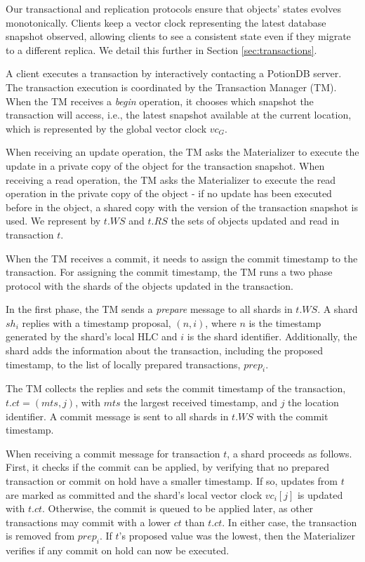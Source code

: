 \documentclass[sigplan,twocolumn,review,anonymous]{acmart}
\newcommand{\andre}[1]{\nbnote{Andre}{blue}{#1}}
\begin{document}
Our transactional and replication protocols ensure that objects' states evolves monotonically.
Clients keep a vector clock representing the latest database snapshot observed, allowing clients to see a consistent state even if they migrate to a different replica.
We detail this further in Section \ref{sec:transactions}. %


A client executes a transaction by interactively contacting a PotionDB server.
The transaction execution is coordinated by the Transaction Manager (TM).
%
When the TM receives a \emph{begin} operation, it chooses which snapshot the
transaction will access, i.e., the latest snapshot available at the current location,
which is represented by the global vector clock $\mathit{vc}_G$.

When receiving an update operation, the TM asks the Materializer to execute the update in
a private copy of the object for the transaction snapshot. When receiving a read operation, 
the TM asks the Materializer to execute the read operation in the private copy 
of the object - if no update has been executed before in the object, a shared copy with the version 
of the transaction snapshot is used. We represent by $t.WS$ and $t.RS$ the sets of objects updated 
and read in transaction $t$.

When the TM receives a commit, it needs to assign the commit timestamp to the transaction. 
For assigning the commit timestamp, the TM runs a two phase protocol with the shards of the objects
updated in the transaction. 
\andre{shouldn't it be named "two phase commit protocol"?}

In the first phase,  the TM sends a \emph{prepare} message to all shards in $t.WS$.
A shard $\mathit{sh}_i$ replies with a timestamp proposal, $(n,i)$, where $n$ is the timestamp
generated by the shard's local HLC and $i$ is the shard identifier. Additionally, the shard adds the information
about the transaction, including the proposed timestamp, to the list of locally prepared transactions, $prep_i$.

The TM collects the replies and sets the commit timestamp of the transaction,  $t\!.\mathit{ct} = (\mathit{mts}, j)$,
with $\mathit{mts}$ the largest received timestamp, and $j$ the 
location identifier.
A commit message is sent to all shards in $t.WS$ with the commit timestamp.

When receiving a commit message for transaction $t$, a shard proceeds as follows.
First, it checks if the commit can be applied, by verifying that no prepared transaction or commit on hold have a 
smaller timestamp.
If so, updates from $t$ are marked as committed and the shard's local vector clock $\mathit{vc}_i[j]$ is 
updated with $t\!.\mathit{ct}$. 
Otherwise, the commit is queued to be applied later, as other transactions may commit with a lower
$\mathit{ct}$ than $t\!.\mathit{ct}$.
In either case,  the transaction is removed from $\mathit{prep}_i$. If $t$'s proposed value was the lowest, 
then the Materializer verifies if any commit on hold can now be executed.
\end{document}
